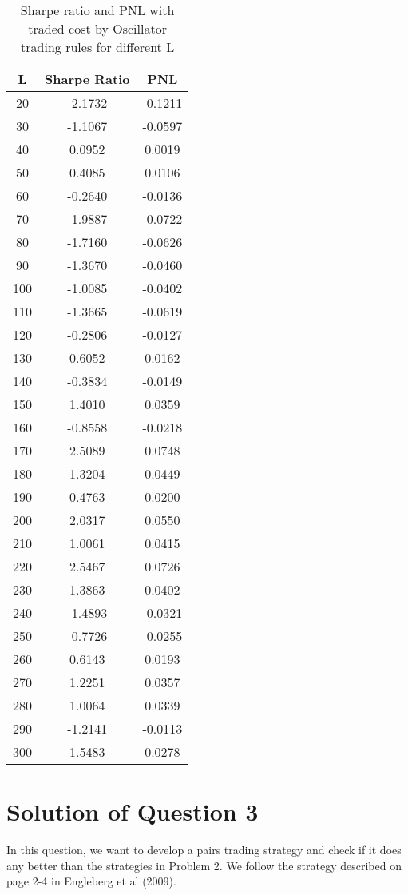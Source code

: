 \documentclass[11pt]{article}
\begin{document}
\begin{table}[ht]
\centering
\begin{tabular}{ccc}
  \hline
L & Sharpe Ratio & PNL \\ 
  \hline
   20 & -2.1732 & -0.1211 \\ 
     30 & -1.1067 & -0.0597 \\ 
     40 & 0.0952 & 0.0019 \\ 
     50 & 0.4085 & 0.0106 \\ 
     60 & -0.2640 & -0.0136 \\ 
     70 & -1.9887 & -0.0722 \\ 
     80 & -1.7160 & -0.0626 \\ 
     90 & -1.3670 & -0.0460 \\ 
    100 & -1.0085 & -0.0402 \\ 
    110 & -1.3665 & -0.0619 \\ 
    120 & -0.2806 & -0.0127 \\ 
    130 & 0.6052 & 0.0162 \\ 
    140 & -0.3834 & -0.0149 \\ 
    150 & 1.4010 & 0.0359 \\ 
    160 & -0.8558 & -0.0218 \\ 
    170 & 2.5089 & 0.0748 \\ 
    180 & 1.3204 & 0.0449 \\ 
    190 & 0.4763 & 0.0200 \\ 
    200 & 2.0317 & 0.0550 \\ 
    210 & 1.0061 & 0.0415 \\ 
    220 & 2.5467 & 0.0726 \\ 
    230 & 1.3863 & 0.0402 \\ 
    240 & -1.4893 & -0.0321 \\ 
    250 & -0.7726 & -0.0255 \\ 
    260 & 0.6143 & 0.0193 \\ 
    270 & 1.2251 & 0.0357 \\ 
    280 & 1.0064 & 0.0339 \\ 
    290 & -1.2141 & -0.0113 \\ 
    300 & 1.5483 & 0.0278 \\ 
   \hline
\end{tabular}
\caption{Sharpe ratio and PNL with traded cost by Oscillator trading rules for different L}\label{rsi_tc}
\end{table}

\section{Solution of Question 3}
In this question, we want to develop a pairs trading strategy and check if it does any better than the strategies in Problem 2. We follow the strategy described on page 2-4 in Engleberg et al (2009). 
\end{document}
